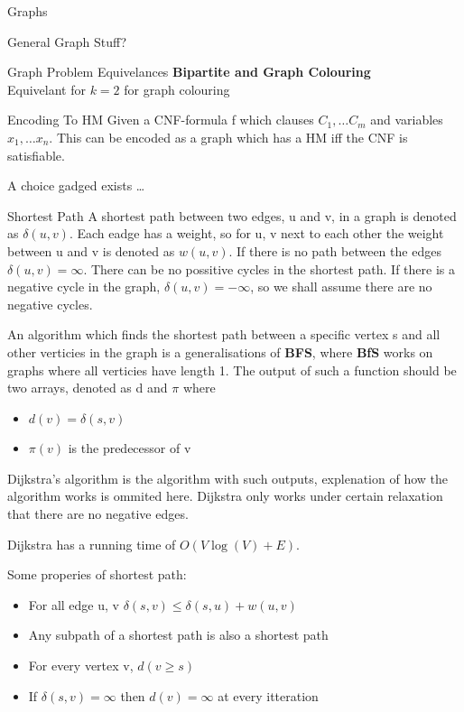 \documentclass[12pt, letterpaper]{article}
\begin{document}
\begin{section}{Graphs}
\begin{subsection}{General Graph Stuff?}
\begin{subsubsection}{Graph Problem Equivelances}
      \textbf{Bipartite and Graph Colouring} \\
      Equivelant for \(k = 2\) for graph colouring

    \end{subsubsection}

    \begin{subsubsection}{Encoding To HM}
      Given a CNF-formula f which clauses \(C_{1}, \dots C_{m}\) and variables
      \(x_{1}, \dots x_{n}\). This can be encoded as a graph which has a HM iff
      the CNF is satisfiable.

      A choice gadged exists \ldots
    \end{subsubsection}

  \end{subsection}

  \begin{subsection}{Shortest Path}
    A shortest path between two edges, u and v, in a graph is denoted
    as \(\delta(u, v)\). Each eadge has a weight, so for u, v next to each other
    the weight between u and v is denoted as \(w(u, v)\).
    If there is no path between the edges \(\delta(u, v) = \infty\).
    There can be no possitive cycles in the shortest path.
    If there is a negative cycle in the graph, \(\delta(u, v) = -\infty\), so
    we shall assume there are no negative cycles.

    An algorithm which finds the shortest path between a specific vertex s
    and all other verticies in the graph is a generalisations of
    \textbf{BFS}, where \textbf{BfS} works on graphs
    where all verticies have length 1.
    The output of such a function should be two arrays, denoted as d and \(\pi\)
    where
    \begin{itemize}
      \item \(d(v) = \delta(s, v)\)
      \item \(\pi(v)\) is the predecessor of v
    \end{itemize}
    Dijkstra's algorithm is the algorithm with such outputs, explenation of
    how the algorithm works is ommited here. Dijkstra only works under certain
    relaxation that there are no negative edges.

    Dijkstra has a running time of \(O(V \log(V) + E)\).

    Some properies of shortest path:
    \begin{itemize}
      \item For all edge u, v \(\delta(s, v) \leq \delta(s, u) + w(u, v)\)
      \item Any subpath of a shortest path is also a shortest path
      \item For every vertex v, \(d(v \geq s)\)
      \item If \(\delta(s, v) = \infty\) then \(d(v) = \infty\) at every itteration
    \end{itemize}
  \end{subsection}


\end{section}
\end{document}
